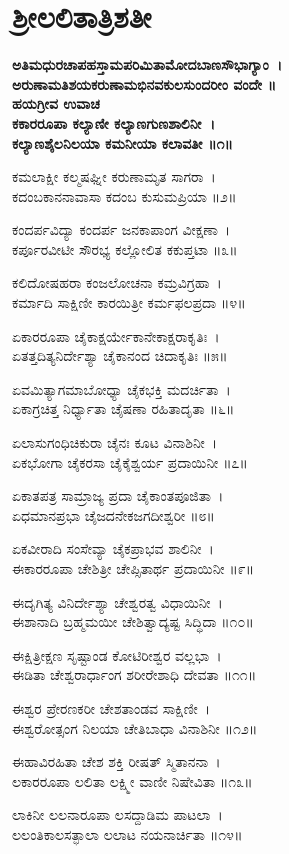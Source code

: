 \section{ಶ್ರೀಲಲಿತಾತ್ರಿಶತೀ}
{\bfseries ಅತಿಮಧುರಚಾಪಹಸ್ತಾಮಪರಿಮಿತಾಮೋದಬಾಣಸೌಭಾಗ್ಯಾಂ~।\\
ಅರುಣಾಮತಿಶಯಕರುಣಾಮಭಿನವಕುಲಸುಂದರೀಂ ವಂದೇ ॥\\
ಹಯಗ್ರೀವ ಉವಾಚ\\
ಕಕಾರರೂಪಾ ಕಲ್ಯಾಣೀ ಕಲ್ಯಾಣಗುಣಶಾಲಿನೀ~।\\
ಕಲ್ಯಾಣಶೈಲನಿಲಯಾ ಕಮನೀಯಾ ಕಲಾವತೀ ॥೧॥

ಕಮಲಾಕ್ಷೀ ಕಲ್ಮಷಘ್ನೀ ಕರುಣಾಮೃತ ಸಾಗರಾ~।\\
ಕದಂಬಕಾನನಾವಾಸಾ ಕದಂಬ ಕುಸುಮಪ್ರಿಯಾ ॥೨॥

ಕಂದರ್ಪವಿದ್ಯಾ ಕಂದರ್ಪ ಜನಕಾಪಾಂಗ ವೀಕ್ಷಣಾ~।\\
ಕರ್ಪೂರವೀಟೀ ಸೌರಭ್ಯ ಕಲ್ಲೋಲಿತ ಕಕುಪ್ತಟಾ ॥೩॥

ಕಲಿದೋಷಹರಾ ಕಂಜಲೋಚನಾ ಕಮ್ರವಿಗ್ರಹಾ~।\\
ಕರ್ಮಾದಿ ಸಾಕ್ಷಿಣೀ ಕಾರಯಿತ್ರೀ ಕರ್ಮಫಲಪ್ರದಾ ॥೪॥

ಏಕಾರರೂಪಾ ಚೈಕಾಕ್ಷರ್ಯೇಕಾನೇಕಾಕ್ಷರಾಕೃತಿಃ~।\\
ಏತತ್ತದಿತ್ಯನಿರ್ದೇಶ್ಯಾ ಚೈಕಾನಂದ ಚಿದಾಕೃತಿಃ ॥೫॥

ಏವಮಿತ್ಯಾಗಮಾಬೋಧ್ಯಾ ಚೈಕಭಕ್ತಿ ಮದರ್ಚಿತಾ~।\\
ಏಕಾಗ್ರಚಿತ್ತ ನಿರ್ಧ್ಯಾತಾ ಚೈಷಣಾ ರಹಿತಾದೃತಾ ॥೬॥

ಏಲಾಸುಗಂಧಿಚಿಕುರಾ ಚೈನಃ ಕೂಟ ವಿನಾಶಿನೀ~।\\
ಏಕಭೋಗಾ ಚೈಕರಸಾ ಚೈಕೈಶ್ವರ್ಯ ಪ್ರದಾಯಿನೀ ॥೭॥

ಏಕಾತಪತ್ರ ಸಾಮ್ರಾಜ್ಯ ಪ್ರದಾ ಚೈಕಾಂತಪೂಜಿತಾ~।\\
ಏಧಮಾನಪ್ರಭಾ ಚೈಜದನೇಕಜಗದೀಶ್ವರೀ ॥೮॥

ಏಕವೀರಾದಿ ಸಂಸೇವ್ಯಾ ಚೈಕಪ್ರಾಭವ ಶಾಲಿನೀ~।\\
ಈಕಾರರೂಪಾ ಚೇಶಿತ್ರೀ ಚೇಪ್ಸಿತಾರ್ಥ ಪ್ರದಾಯಿನೀ ॥೯॥

ಈದೃಗಿತ್ಯ ವಿನಿರ್ದೇಶ್ಯಾ ಚೇಶ್ವರತ್ವ ವಿಧಾಯಿನೀ~।\\
ಈಶಾನಾದಿ ಬ್ರಹ್ಮಮಯೀ ಚೇಶಿತ್ವಾದ್ಯಷ್ಟ ಸಿದ್ಧಿದಾ ॥೧೦॥

ಈಕ್ಷಿತ್ರೀಕ್ಷಣ ಸೃಷ್ಟಾಂಡ ಕೋಟಿರೀಶ್ವರ ವಲ್ಲಭಾ~।\\
ಈಡಿತಾ ಚೇಶ್ವರಾರ್ಧಾಂಗ ಶರೀರೇಶಾಧಿ ದೇವತಾ ॥೧೧॥

ಈಶ್ವರ ಪ್ರೇರಣಕರೀ ಚೇಶತಾಂಡವ ಸಾಕ್ಷಿಣೀ~।\\
ಈಶ್ವರೋತ್ಸಂಗ ನಿಲಯಾ ಚೇತಿಬಾಧಾ ವಿನಾಶಿನೀ ॥೧೨॥

ಈಹಾವಿರಹಿತಾ ಚೇಶ ಶಕ್ತಿ ರೀಷತ್ ಸ್ಮಿತಾನನಾ~।\\
ಲಕಾರರೂಪಾ ಲಲಿತಾ ಲಕ್ಷ್ಮೀ ವಾಣೀ ನಿಷೇವಿತಾ ॥೧೩॥

ಲಾಕಿನೀ ಲಲನಾರೂಪಾ ಲಸದ್ದಾಡಿಮ ಪಾಟಲಾ~।\\
ಲಲಂತಿಕಾಲಸತ್ಫಾಲಾ ಲಲಾಟ ನಯನಾರ್ಚಿತಾ ॥೧೪॥

}
